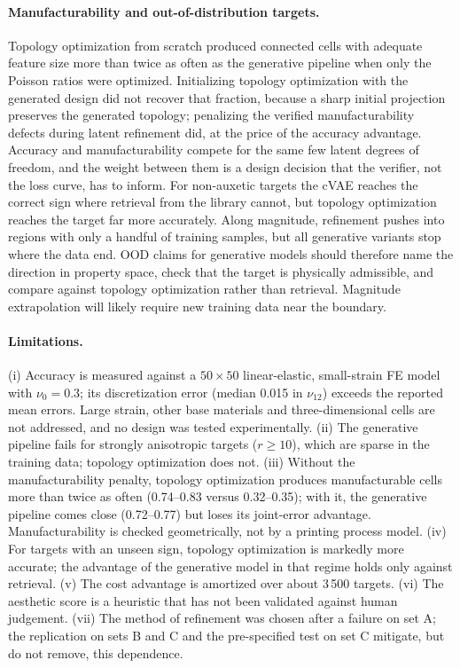 \documentclass[a4paper,11pt]{article}
\newcommand{\nuot}{\nu_{12}}
\begin{document}
\paragraph{Manufacturability and out-of-distribution targets.}
Topology optimization from scratch produced connected cells with adequate
feature size more than twice as often as the generative pipeline when only
the Poisson ratios were optimized. Initializing topology optimization with
the generated design did not recover that fraction, because a sharp initial
projection preserves the generated topology; penalizing the verified
manufacturability defects during latent refinement did, at the price of the
accuracy advantage. Accuracy and manufacturability compete for the same few
latent degrees of freedom, and the weight between them is a design decision
that the verifier, not the loss curve, has to inform. For non-auxetic targets
the cVAE reaches the correct sign where retrieval from the library cannot,
but topology optimization reaches the target far more accurately. Along
magnitude, refinement pushes into regions with only a handful of training
samples, but all generative variants stop where the data end. OOD claims
for generative models should therefore name the direction in property space,
check that the target is physically admissible, and compare against
topology optimization rather than retrieval. Magnitude extrapolation will
likely require new training data near the boundary.

\paragraph{Limitations.}
(i) Accuracy is measured against a $50\times50$ linear-elastic,
small-strain FE model with $\nu_0=0.3$; its discretization error (median
0.015 in $\nuot$) exceeds the reported mean errors. Large strain, other base
materials and three-dimensional cells are not addressed, and no design was
tested experimentally.
(ii) The generative pipeline fails for strongly anisotropic targets
($r\ge10$), which are sparse in the training data; topology optimization does
not.
(iii) Without the manufacturability penalty, topology optimization produces
manufacturable cells more than twice as often (0.74--0.83 versus 0.32--0.35);
with it, the generative pipeline comes close (0.72--0.77) but loses its
joint-error advantage. Manufacturability is checked geometrically, not by a
printing process model.
(iv) For targets with an unseen sign, topology optimization is markedly more
accurate; the advantage of the generative model in that regime holds only
against retrieval.
(v) The cost advantage is amortized over about 3\,500 targets.
(vi) The aesthetic score is a heuristic that has not been validated against
human judgement.
(vii) The method of refinement was chosen after a failure on set A; the
replication on sets B and C and the pre-specified test on set C mitigate,
but do not remove, this dependence.
\end{document}

